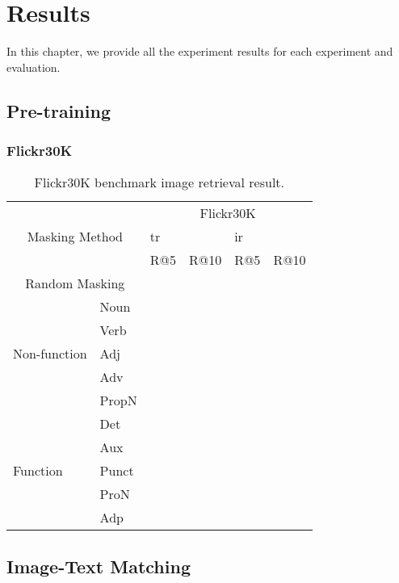 \chapter{Results}
In this chapter, we provide all the experiment results for each experiment and evaluation.

\section{Pre-training}

\subsection{Flickr30K}

\begin{table}[]
    \centering
    \label{tab:flickr30k}
    \caption{Flickr30K benchmark image retrieval result.}
    \begin{tabular}{ll|llll}
        \multicolumn{2}{c|}{\multirow{3}{*}{Masking Method}} & \multicolumn{4}{c}{Flickr30K} \\
        \multicolumn{2}{l|}{} & \multicolumn{2}{l}{\acrshort{tr}} & \multicolumn{2}{l}{\acrshort{ir}} \\
        \multicolumn{2}{l|}{} & R@5 & R@10 & R@5 & R@10 \\
        \hline
        \multicolumn{2}{c|}{Random Masking} & & & & \\
        \hline
        \multirow{5}{*}{Non-function} & Noun & & & & \\
        & Verb & & & & \\
        & Adj & & & & \\
        & Adv & & & & \\
        & PropN & & & & \\
        \hline
        \multirow{5}{*}{Function} & Det & & & & \\
        & Aux & & & & \\
        & Punct & & & & \\
        & ProN & & & & \\
        & Adp & & & & \\
    \end{tabular}
\end{table}

\section{Image-Text Matching}

